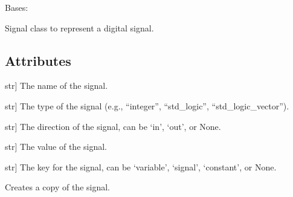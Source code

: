 \documentclass[letterpaper,10pt,english]{sphinxmanual}
\begin{document}

\begin{fulllineitems}
\label{\detokenize{a_signal:a_signal.Signal}}
\pysigstartsignatures
{}
\pysigstopsignatures
\sphinxAtStartPar
Bases: 

\sphinxAtStartPar
Signal class to represent a digital signal.


\subsection{Attributes}
\label{\detokenize{a_signal:id1}}\begin{description}
\sphinxlineitem{name}{[}str{]}
\sphinxAtStartPar
The name of the signal.

\sphinxlineitem{type}{[}str{]}
\sphinxAtStartPar
The type of the signal (e.g., “integer”, “std\_logic”, “std\_logic\_vector”).

\sphinxlineitem{direction}{[}str{]}
\sphinxAtStartPar
The direction of the signal, can be ‘in’, ‘out’, or None.

\sphinxlineitem{value}{[}str{]}
\sphinxAtStartPar
The value of the signal.

\sphinxlineitem{key}{[}str{]}
\sphinxAtStartPar
The key for the signal, can be ‘variable’, ‘signal’, ‘constant’, or None.

\end{description}

\begin{fulllineitems}
\label{\detokenize{a_signal:a_signal.Signal.copy}}
\pysigstartsignatures
{}
\pysigstopsignatures
\sphinxAtStartPar
Creates a copy of the signal.



\end{fulllineitems}
\end{fulllineitems}
\end{document}
